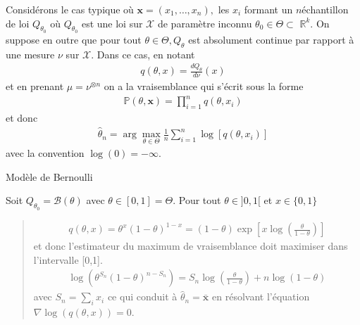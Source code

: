 \documentclass[letterpaper,11pt,english]{sphinxmanual}
\begin{document}
\sphinxAtStartPar
Considérons le cas typique où
\(\mathbf{x}=\left(x_{1}, \ldots, x_{n}\right),\) les \(x_{i}\)
formant un \(n\)\sphinxhyphen{}échantillon de loi \(Q_{\theta_{0}}\) où
\(Q_{\theta_{0}}\) est une loi sur \(\mathcal{X}\) de paramètre
inconnu \(\theta_{0} \in \Theta \subset\) \(\mathbb{R}^{k} .\)
On suppose en outre que pour tout \(\theta \in \Theta, Q_{\theta}\)
est absolument continue par rapport à une mesure \(\nu\) sur
\(\mathcal{X}\). Dans ce cas, en notant
\begin{equation}\label{equation:chapter2:chapter2:70}
\begin{split}q(\theta, x)=\frac{d Q_{\theta}}{d \nu}(x)\end{split}
\end{equation}
\sphinxAtStartPar
et en prenant \(\mu=\nu^{\otimes n}\) on a la vraisemblance qui
s’écrit sous la forme
\begin{equation}\label{equation:chapter2:chapter2:71}
\begin{split}\mathbb{P}(\theta, \mathbf{x})=\prod_{i=1}^{n} q\left(\theta, x_{i}\right)\end{split}
\end{equation}
\sphinxAtStartPar
et donc
\begin{equation}\label{equation:chapter2:chapter2:72}
\begin{split}\hat{\theta}_{n}=\arg \max _{\theta \in \Theta} \frac{1}{n} \sum_{i=1}^{n} \log \left[q\left(\theta, x_{i}\right)\right]\end{split}
\end{equation}
\sphinxAtStartPar
avec la convention \(\log (0)=-\infty .\)

\begin{DUlineblock}{0em}
\item[]  Modèle de Bernoulli
\item[] Soit \(Q_{\theta_{0}}=\mathcal{B}(\theta)\) avec
\(\theta \in[0,1]=\Theta\). Pour tout \(\theta \in] 0,1[\) et
\(x \in\{0,1\}\)
\end{DUlineblock}
\begin{quote}
\begin{equation}\label{equation:chapter2:chapter2:73}
\begin{split}q(\theta, x)=\theta^{x}(1-\theta)^{1-x}=(1-\theta) \exp \left[x \log \left(\frac{\theta}{1-\theta}\right)\right]\end{split}
\end{equation}
\sphinxAtStartPar
et donc l’estimateur du maximum de vraisemblance doit maximiser dans
l’intervalle {[}0,1{]}.
\begin{equation}\label{equation:chapter2:chapter2:74}
\begin{split}\log \left(\theta^{S_{n}}(1-\theta)^{n-S_{n}}\right)=S_{n} \log \left(\frac{\theta}{1-\theta}\right)+n \log (1-\theta)\end{split}
\end{equation}
\sphinxAtStartPar
avec \(S_n = \sum_{i} x_i\) ce qui conduit à
\(\hat{\theta}_{n}=\bar{\mathbf{x}}\) en résolvant l’équation
\(\nabla \log(q(\theta, x)) = 0\).
\end{quote}
\end{document}
